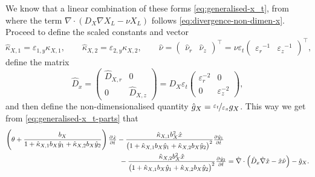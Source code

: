 \documentclass[11pt]{article}
\numberwithin{equation}{section}
\begin{document}
We know that a linear combination of these forms \eqref{eq:generalised-x_t}, from where the term \(\nabla \cdot (D_X \nabla X_L - \nu X_L)\) follows \eqref{eq:divergence-non-dimen-x}.
Proceed to define the scaled constants and vector
\[
    \hat{\kappa}_{X,1} = \varepsilon_{1,y} \kappa_{X,1},
    \qquad
    \hat{\kappa}_{X,2} = \varepsilon_{2,y} \kappa_{X,2},
    \qquad
    \hat{\nu} = 
    \begin{pmatrix}   \hat{\nu}_r    &    \hat{\nu}_z    \end{pmatrix}^\top
    =
    \nu \varepsilon_t
    \begin{pmatrix}    {\varepsilon_r}^{-1}    &    {\varepsilon_z}^{-1}
    \end{pmatrix}^\top ,
\]
define the matrix
\[
    \hat{D}_x = 
    \begin{pmatrix}
         \hat{D}_{X,r} & 0 
         \\
        0 &  \hat{D}_{X,z}
    \end{pmatrix}
    =
    D_X \varepsilon_t
    \begin{pmatrix}
         \varepsilon_r^{-2} & 0 
         \\
        0 &  \varepsilon_z^{-2}
    \end{pmatrix}
    ,
\]
and then define the non-dimensionalised quantity \( \hat{g}_X = \nicefrac{\varepsilon_t}{\varepsilon_x} g_X\). This way we get from \eqref{eq:generalised-x_t-parts} that
\begin{equation}
\begin{aligned}
    \left( \theta + \frac{b_X}{1 + \hat{\kappa}_{X,1} b_{X} \hat{y}_1 + \hat{\kappa}_{X,2} b_{X} \hat{y}_2 } \right)  \pd{\hat{x}}{\hat{t}}
    &
    -\frac{\hat{\kappa}_{X,1} b_X^2 \hat{x}}{\big(1+ \hat{\kappa}_{X,1} b_X \hat{y}_1 + \hat{\kappa}_{X,2} b_X \hat{y}_2 \big)^2} \pd{\hat y_1}{\hat t}
    \\
    &\,\,
    -\frac{\hat{\kappa}_{X,2} b_X^2 \hat{x}}{\big(1+ \hat{\kappa}_{X,1} b_X \hat{y}_1 + \hat{\kappa}_{X,2} b_X \hat{y}_2 \big)^2} \pd{\hat y_2}{\hat t}
    =
    \hat{\nabla}
    \cdot
    \left( 
        \hat{D}_x \hat{\nabla} \hat{x} - \hat{x} \hat{\nu}
    \right)
    - \hat{g}_X.
\end{aligned}
\end{equation}
\end{document}
